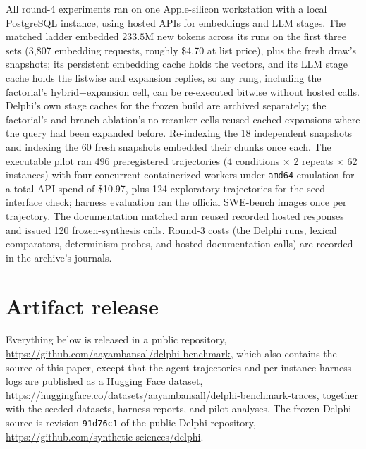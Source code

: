 \documentclass{article}
\newcommand{\system}{Delphi}
\begin{document}
All round-4 experiments ran on one Apple-silicon workstation with a local PostgreSQL instance, using hosted APIs for embeddings and LLM stages. The matched ladder embedded $233.5$M new tokens across its runs on the first three sets (3{,}807 embedding requests, roughly \$4.70 at list price), plus the fresh draw's snapshots; its persistent embedding cache holds the vectors, and its LLM stage cache holds the listwise and expansion replies, so any rung, including the factorial's hybrid+expansion cell, can be re-executed bitwise without hosted calls. \system{}'s own stage caches for the frozen build are archived separately; the factorial's and branch ablation's no-reranker cells reused cached expansions where the query had been expanded before. Re-indexing the 18 independent snapshots and indexing the 60 fresh snapshots embedded their chunks once each. The executable pilot ran 496 preregistered trajectories (4 conditions $\times$ 2 repeats $\times$ 62 instances) with four concurrent containerized workers under \texttt{amd64} emulation for a total API spend of \$10.97, plus 124 exploratory trajectories for the seed-interface check; harness evaluation ran the official SWE-bench images once per trajectory. The documentation matched arm reused recorded hosted responses and issued 120 frozen-synthesis calls. Round-3 costs (the \system{} runs, lexical comparators, determinism probes, and hosted documentation calls) are recorded in the archive's journals.

\section{Artifact release}
\label{app:release}

Everything below is released in a public repository, \url{https://github.com/aayambansal/delphi-benchmark}, which also contains the source of this paper, except that the agent trajectories and per-instance harness logs are published as a Hugging Face dataset, \url{https://huggingface.co/datasets/aayambansall/delphi-benchmark-traces}, together with the seeded datasets, harness reports, and pilot analyses. The frozen \system{} source is revision \texttt{91d76c1} of the public \system{} repository, \url{https://github.com/synthetic-sciences/delphi}.
\end{document}
